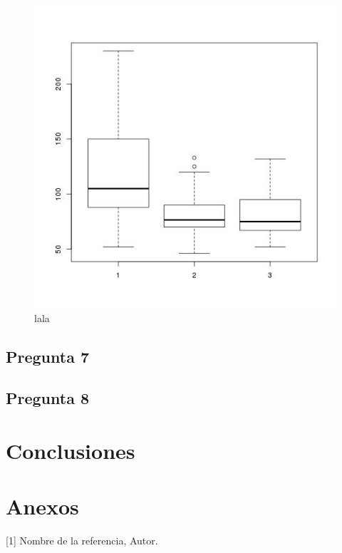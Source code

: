 \documentclass[letter,10pt]{article}
\begin{document}
\begin{figure}[h!]
    \centering
    \includegraphics[scale=0.5]{boxplot_horsepower_origin.jpg}
    \caption{lala}
    \label{fig:lala}
\end{figure}


\subsection{Pregunta 7}

\subsection{Pregunta 8}


\section{Conclusiones}

\section{Anexos}





[1] Nombre de la referencia, Autor.
\end{document}
